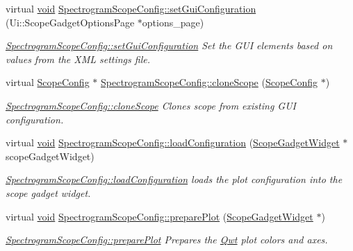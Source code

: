 \begin{DoxyCompactItemize}
\item 
virtual \hyperlink{group___u_a_v_objects_plugin_ga444cf2ff3f0ecbe028adce838d373f5c}{void} \hyperlink{group___scope_plugin_gaf4d1958704699a8b7bb596fef64c6bd5}{Spectrogram\-Scope\-Config\-::set\-Gui\-Configuration} (Ui\-::\-Scope\-Gadget\-Options\-Page $\ast$options\-\_\-page)
\begin{DoxyCompactList}\small\item\em \hyperlink{group___scope_plugin_gaf4d1958704699a8b7bb596fef64c6bd5}{Spectrogram\-Scope\-Config\-::set\-Gui\-Configuration} Set the G\-U\-I elements based on values from the X\-M\-L settings file. \end{DoxyCompactList}\item 
virtual \hyperlink{class_scope_config}{Scope\-Config} $\ast$ \hyperlink{group___scope_plugin_ga7d2fafe0c5f703d03825ad42689a9d73}{Spectrogram\-Scope\-Config\-::clone\-Scope} (\hyperlink{class_scope_config}{Scope\-Config} $\ast$)
\begin{DoxyCompactList}\small\item\em \hyperlink{group___scope_plugin_ga7d2fafe0c5f703d03825ad42689a9d73}{Spectrogram\-Scope\-Config\-::clone\-Scope} Clones scope from existing G\-U\-I configuration. \end{DoxyCompactList}\item 
virtual \hyperlink{group___u_a_v_objects_plugin_ga444cf2ff3f0ecbe028adce838d373f5c}{void} \hyperlink{group___scope_plugin_gaa4de5cf86195631ccdce65d67b22f31a}{Spectrogram\-Scope\-Config\-::load\-Configuration} (\hyperlink{class_scope_gadget_widget}{Scope\-Gadget\-Widget} $\ast$scope\-Gadget\-Widget)
\begin{DoxyCompactList}\small\item\em \hyperlink{group___scope_plugin_gaa4de5cf86195631ccdce65d67b22f31a}{Spectrogram\-Scope\-Config\-::load\-Configuration} loads the plot configuration into the scope gadget widget. \end{DoxyCompactList}\item 
virtual \hyperlink{group___u_a_v_objects_plugin_ga444cf2ff3f0ecbe028adce838d373f5c}{void} \hyperlink{group___scope_plugin_ga56b200887661925df25743af2f62375b}{Spectrogram\-Scope\-Config\-::prepare\-Plot} (\hyperlink{class_scope_gadget_widget}{Scope\-Gadget\-Widget} $\ast$)
\begin{DoxyCompactList}\small\item\em \hyperlink{group___scope_plugin_ga56b200887661925df25743af2f62375b}{Spectrogram\-Scope\-Config\-::prepare\-Plot} Prepares the \hyperlink{namespace_qwt}{Qwt} plot colors and axes. \end{DoxyCompactList}\item 

\end{DoxyCompactItemize}
